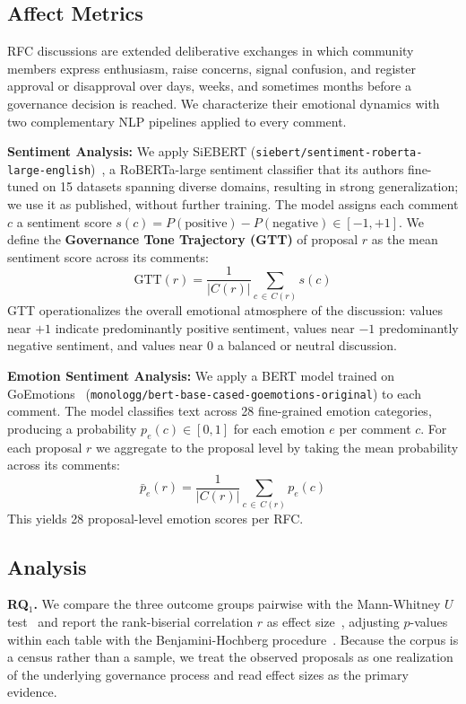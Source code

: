 \documentclass[conference]{IEEEtran}
\begin{document}
\subsection{Affect Metrics}
RFC discussions are extended deliberative exchanges in which community members express enthusiasm, raise concerns, signal confusion, and register approval or disapproval over days, weeks, and sometimes months before a governance decision is reached. We characterize their emotional dynamics with two complementary NLP pipelines applied to every comment.

\textbf{Sentiment Analysis:} We apply SiEBERT (\texttt{siebert/sentiment-roberta-large-english})~\cite{hartmann2023more}, a RoBERTa-large sentiment classifier that its authors fine-tuned on 15 datasets spanning diverse domains, resulting in strong generalization; we use it as published, without further training. The model assigns each comment $c$ a sentiment score $s(c) = P(\text{positive}) - P(\text{negative}) \in [-1, +1]$. We define the \textbf{Governance Tone Trajectory (GTT)} of proposal $r$ as the mean sentiment score across its comments:
\begin{equation}
  \text{GTT}(r) = \frac{1}{|C(r)|}
  \sum_{c \,\in\, C(r)} s(c)
  \label{eq:gtt}
\end{equation}
GTT operationalizes the overall emotional atmosphere of the discussion: values near $+1$ indicate predominantly positive sentiment, values near $-1$ predominantly negative sentiment, and values near $0$ a balanced or neutral discussion.

\textbf{Emotion Sentiment Analysis:} We apply a BERT model trained on GoEmotions~\cite{demszky2020goemotions} (\texttt{monologg/bert-base-cased-goemotions-original}) to each comment. The model classifies text across 28 fine-grained emotion categories, producing a probability $p_e(c) \in [0,1]$ for each emotion $e$ per comment $c$. For each proposal $r$ we aggregate to the proposal level by taking the mean probability across its comments:
\begin{equation}
  \bar{p}_e(r) = \frac{1}{|C(r)|}
  \sum_{c \,\in\, C(r)} p_e(c)
  \label{eq:goe_mean}
\end{equation}
This yields 28 proposal-level emotion scores per RFC.

\subsection{Analysis}
\textbf{RQ$_1$.} We compare the three outcome groups pairwise with the Mann-Whitney $U$ test~\cite{mann1947test} and report the rank-biserial correlation $r$ as effect size~\cite{kerby2014simple}, adjusting $p$-values within each table with the Benjamini-Hochberg procedure~\cite{benjamini1995controlling}. Because the corpus is a census rather than a sample, we treat the observed proposals as one realization of the underlying governance process and read effect sizes as the primary evidence.
\end{document}
